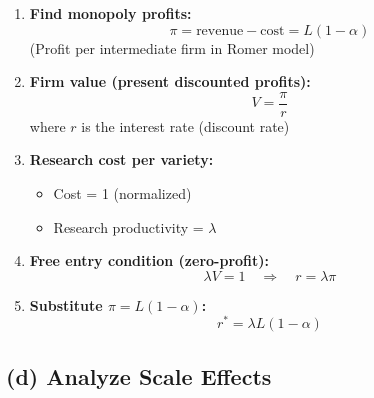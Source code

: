 \begin{enumerate}
    \item \textbf{Find monopoly profits:}
    \[
    \pi = \text{revenue} - \text{cost} = L(1-\alpha)
    \]
    (Profit per intermediate firm in Romer model)
    
    \item \textbf{Firm value (present discounted profits):}
    \[
    V = \frac{\pi}{r}
    \]
    where $r$ is the interest rate (discount rate)
    
    \item \textbf{Research cost per variety:}
    \begin{itemize}
        \item Cost = 1 (normalized)
        \item Research productivity = $\lambda$
    \end{itemize}
    
    \item \textbf{Free entry condition (zero-profit):}
    \[
    \lambda V = 1 \quad \Rightarrow \quad r = \lambda \pi
    \]
    
    \item \textbf{Substitute $\pi = L(1-\alpha)$:}
    \[
    r^* = \lambda L (1-\alpha)
    \]
\end{enumerate}

\begin{resultbox}
\end{resultbox}

\medskip

\subsection*{(d) Analyze Scale Effects}

